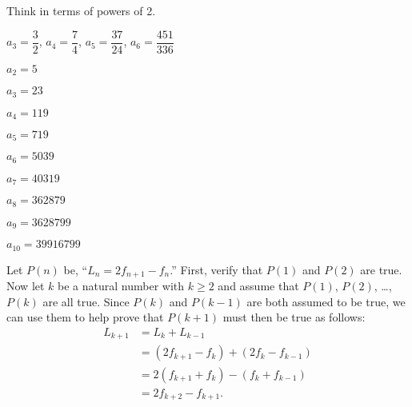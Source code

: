 \begin{list}{}
\item \begin{list}{\bf{(b)}}
\item Think in terms of powers of 2.
\end{list}
\end{list}

\begin{list}{\bf{\ref{exer:sec53-7}.}}
\item \begin{list}{\bf{(a)}}
\item $a_3 = \dfrac{3}{2}$, $a_4 =\dfrac{7}{4}$, $a_5 =\dfrac{37}{24}$, $a_6 =\dfrac{451}{336}$
\end{list}
\end{list}



\pagebreak
\begin{list}{\bf{\ref{exer:sec53-9}.}}
\item \begin{list}{\bf{(b)}}
\item \begin{multicols}{3}
$a_2 = 5$

$a_3 = 23$

$a_4 = 119$

$a_5 = 719$

$a_6 = 5039$

$a_7 = 40319$

$a_8 = 362879$

$a_9 = 3628799$

$a_{10} = 39916799$
\end{multicols}
\end{list}
\end{list}


\begin{list}{\bf{\ref{exer:lucasnumbers}.}}
\item \begin{list}{\bf{(a)}}
\item Let $P(n)$ be, ``$L_n = 2f_{n+1} - f_n$.''  First, verify that $P(1)$ and $P(2)$ are true.  Now let $k$ be a natural number with $k \geq 2$ and assume that $P(1)$, $P(2)$, \ldots, 
$P(k)$ are all true. Since $P(k)$ and $P(k-1)$ are both assumed to be true, we can use them to help prove that $P(k+1)$ must then be true as follows:
\begin{align*}
L_{k+1} &= L_k + L_{k-1} \\
        &= \left( 2f_{k+1} - f_k \right) + \left( 2f_k - f_{k-1} \right) \\
        &= 2 \left( f_{k+1} + f_k \right) - \left( f_k + f_{k-1} \right) \\
        &= 2f_{k+2} - f_{k+1}.
\end{align*}
\end{list}
\end{list}


